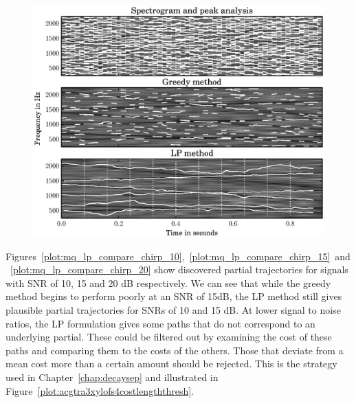\begin{figure}[!t]
    \centering
    \includegraphics[width=\figwidthscale\textwidth]{plots/mq_lp_compare_chirp_10.eps}
\end{figure}
Figures~\ref{plot:mq_lp_compare_chirp_10},~\ref{plot:mq_lp_compare_chirp_15}~and~\ref{plot:mq_lp_compare_chirp_20}
show discovered partial trajectories for signals with SNR of 10, 15 and 20 dB
respectively. We can see that while the greedy method begins to perform poorly
at an SNR of 15dB, the LP method still gives plausible partial trajectories for
SNRs of 10 and 15 dB. At lower signal to noise ratios, the LP formulation gives
some paths that do not correspond to an underlying partial. These could be filtered
out by examining the cost of these paths and comparing them to the costs of the
others. Those that deviate from a mean cost more than a certain amount should be
rejected. This is the strategy used in Chapter~\ref{chap:decaysep} and
illustrated in Figure~\ref{plot:acgtra3xylofs4costlengththresh}.

